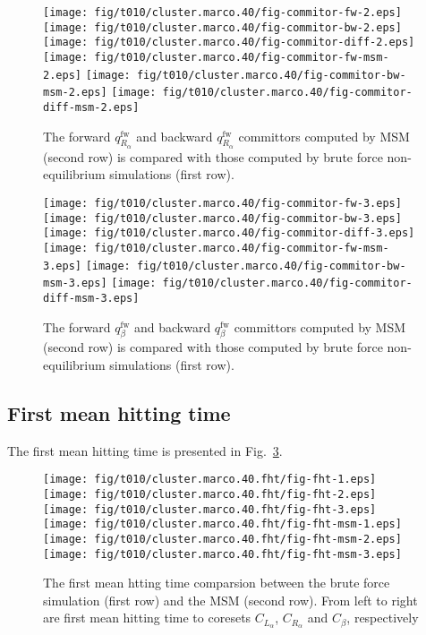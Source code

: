 \documentclass[aps, pre, preprint,unsortedaddress,a4paper,onecolumn]{revtex4}
\newcommand{\fwd}[0]{\textrm{fw}}
\begin{document}
\begin{figure}
  \centering
  \texttt{[image: fig/t010/cluster.marco.40/fig-commitor-fw-2.eps]}
  \texttt{[image: fig/t010/cluster.marco.40/fig-commitor-bw-2.eps]}
  \texttt{[image: fig/t010/cluster.marco.40/fig-commitor-diff-2.eps]}\\
  \texttt{[image: fig/t010/cluster.marco.40/fig-commitor-fw-msm-2.eps]}
  \texttt{[image: fig/t010/cluster.marco.40/fig-commitor-bw-msm-2.eps]}
  \texttt{[image: fig/t010/cluster.marco.40/fig-commitor-diff-msm-2.eps]}
  \caption{The forward $q^\fwd_{R_\alpha}$ and backward $q^\fwd_{R_\alpha}$ committors computed by MSM (second row) is compared with those computed by brute force non-equilibrium simulations (first row).}  
  \label{fig:num-4}
\end{figure}

\begin{figure}
  \centering
  \texttt{[image: fig/t010/cluster.marco.40/fig-commitor-fw-3.eps]}
  \texttt{[image: fig/t010/cluster.marco.40/fig-commitor-bw-3.eps]}
  \texttt{[image: fig/t010/cluster.marco.40/fig-commitor-diff-3.eps]}\\
  \texttt{[image: fig/t010/cluster.marco.40/fig-commitor-fw-msm-3.eps]}
  \texttt{[image: fig/t010/cluster.marco.40/fig-commitor-bw-msm-3.eps]}
  \texttt{[image: fig/t010/cluster.marco.40/fig-commitor-diff-msm-3.eps]}
  \caption{The forward $q^\fwd_{\beta}$ and backward $q^\fwd_{\beta}$ committors computed by MSM (second row) is compared with those computed by brute force non-equilibrium simulations (first row).}  
  \label{fig:num-5}
\end{figure}

\subsection{First mean hitting time}

The first mean hitting time is presented in Fig.~\ref{fig:num-6}.

\begin{figure}
  \centering
  \texttt{[image: fig/t010/cluster.marco.40.fht/fig-fht-1.eps]}
  \texttt{[image: fig/t010/cluster.marco.40.fht/fig-fht-2.eps]}
  \texttt{[image: fig/t010/cluster.marco.40.fht/fig-fht-3.eps]}\\
  \texttt{[image: fig/t010/cluster.marco.40.fht/fig-fht-msm-1.eps]}
  \texttt{[image: fig/t010/cluster.marco.40.fht/fig-fht-msm-2.eps]}
  \texttt{[image: fig/t010/cluster.marco.40.fht/fig-fht-msm-3.eps]}
  \caption{The first mean htting time comparsion between the brute force simulation (first row) and the MSM (second row).
  From left to right are first mean hitting time to coresets $C_{L_\alpha}$, $C_{R_\alpha}$ and $C_{\beta}$, respectively}  
  \label{fig:num-6}
\end{figure}
\end{document}

